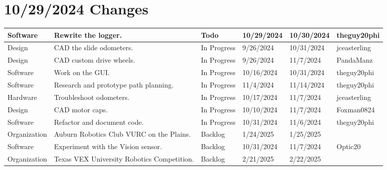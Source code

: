 \section{10/29/2024 Changes}
\begin{center}
\begin{longtable}{| p{40pt} | p{150pt} | p{35pt} | p{33pt} | p{33pt} | p{40pt} |}
\hline \rowcolor{IndianRed1}
Software & Rewrite the logger. & Todo & 10/29/2024 & 10/30/2024 & theguy20phi \\
\hline \rowcolor{LightGoldenrod1}
Design & CAD the slide odometers. & In Progress & 9/26/2024 & 10/31/2024 & jceasterling \\
\hline \rowcolor{LightGoldenrod1}
Design & CAD custom drive wheels. & In Progress & 9/26/2024 & 11/7/2024 & PandaManz \\
\hline \rowcolor{LightGoldenrod1}
Software & Work on the GUI. & In Progress & 10/16/2024 & 10/31/2024 & theguy20phi \\
\hline \rowcolor{LightGoldenrod1}
Software & Research and prototype path planning. & In Progress & 11/4/2024 & 11/14/2024 & theguy20phi \\
\hline \rowcolor{LightGoldenrod1}
Hardware & Troubleshoot odometers. & In Progress & 10/17/2024 & 11/7/2024 & jceasterling \\
\hline \rowcolor{LightGoldenrod1}
Design & CAD motor caps. & In Progress & 10/10/2024 & 11/7/2024 & Foxman0824 \\
\hline \rowcolor{LightGoldenrod1}
Software & Refactor and document code. & In Progress & 10/31/2024 & 11/6/2024 & theguy20phi \\
\hline \rowcolor{Ivory2}
Organization & Auburn Robotics Club VURC on the Plains. & Backlog & 1/24/2025 & 1/25/2025 & \\
\hline \rowcolor{Ivory2}
Software & Experiment with the Vision sensor. & Backlog & 10/31/2024 & 11/7/2024 & Optic20 \\
\hline \rowcolor{Ivory2}
Organization & Texas VEX University Robotics Competition. & Backlog & 2/21/2025 & 2/22/2025 & \\
\hline
\end{longtable}
\end{center}


